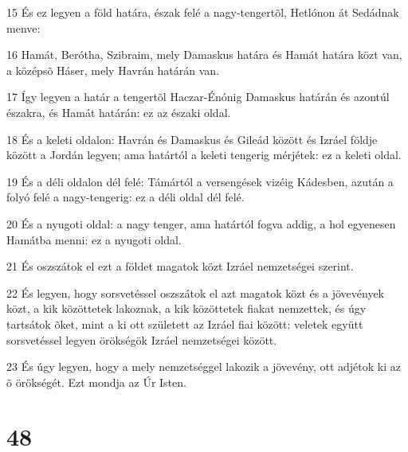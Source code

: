 \par 15 És ez legyen a föld határa, észak felé a nagy-tengertõl, Hetlónon át Sedádnak menve:
\par 16 Hamát, Berótha, Szibraim, mely Damaskus határa és Hamát határa közt van, a középsõ Háser, mely Havrán határán van.
\par 17 Így legyen a határ a tengertõl Haczar-Énónig Damaskus határán és azontúl északra, és Hamát határán: ez az északi oldal.
\par 18 És a keleti oldalon: Havrán és Damaskus és Gileád között és Izráel földje között a Jordán legyen; ama határtól a keleti tengerig mérjétek: ez a keleti oldal.
\par 19 És a déli oldalon dél felé: Támártól a versengések vizéig Kádesben, azután a folyó felé a nagy-tengerig: ez a déli oldal dél felé.
\par 20 És a nyugoti oldal: a nagy tenger, ama határtól fogva addig, a hol egyenesen Hamátba menni: ez a nyugoti oldal.
\par 21 És oszszátok el ezt a földet magatok közt Izráel nemzetségei szerint.
\par 22 És legyen, hogy sorsvetéssel oszszátok el azt magatok közt és a jövevények közt, a kik közöttetek lakoznak, a kik közöttetek fiakat nemzettek, és úgy tartsátok õket, mint a ki ott született az Izráel fiai között: veletek együtt sorsvetéssel legyen örökségök Izráel nemzetségei között.
\par 23 És úgy legyen, hogy a mely nemzetséggel lakozik a jövevény, ott adjétok ki az õ örökségét. Ezt mondja az Úr Isten.

\chapter{48}

